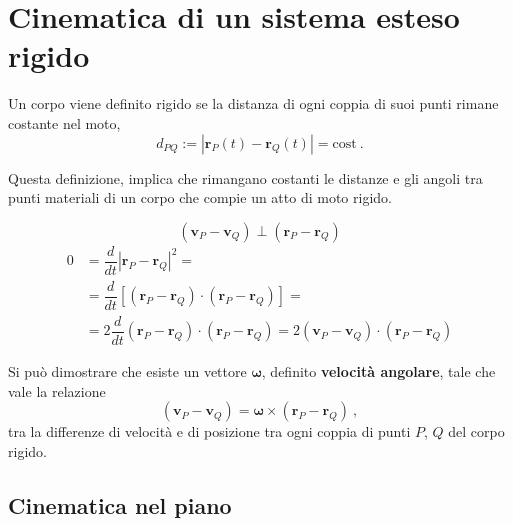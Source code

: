 \section{Cinematica di un sistema esteso rigido}
\begin{definition} Un corpo viene definito rigido se la distanza di ogni coppia di suoi punti rimane costante nel moto,
    \begin{equation}
        d_{PQ} := | \mathbf{r}_P(t) - \mathbf{r}_Q(t) | = \text{cost} \ .
    \end{equation}
\end{definition}
Questa definizione, implica che rimangano costanti le distanze e gli angoli tra punti materiali di un corpo che compie un atto di moto rigido.

\begin{equation}
    \left( \mathbf{v}_P - \mathbf{v}_Q \right) \perp \left( \mathbf{r}_P - \mathbf{r}_Q \right)
\end{equation}
\begin{equation}
\begin{aligned}
    0 & = \dfrac{d}{dt} | \mathbf{r}_P - \mathbf{r}_Q |^2 = \\
    & = \dfrac{d}{dt} \left[ \left( \mathbf{r}_P - \mathbf{r}_Q \right) \cdot \left( \mathbf{r}_P - \mathbf{r}_Q \right) \right] = \\
    & = 2 \dfrac{d}{dt} \left( \mathbf{r}_P - \mathbf{r}_Q \right) \cdot \left( \mathbf{r}_P - \mathbf{r}_Q \right) = 2 \left( \mathbf{v}_P - \mathbf{v}_Q \right) \cdot \left( \mathbf{r}_P - \mathbf{r}_Q \right)
\end{aligned}
\end{equation}

\begin{definition} Si può dimostrare che esiste un vettore $\mathbf{\omega}$, definito \textbf{velocità angolare}, tale che vale la relazione 
\begin{equation}
    \left( \mathbf{v}_P - \mathbf{v}_Q \right) = \boldsymbol{\omega} \times \left( \mathbf{r}_P - \mathbf{r}_Q \right) \ ,
\end{equation}
tra la differenze di velocità e di posizione tra ogni coppia di punti $P$, $Q$ del corpo rigido.
\end{definition}

\subsection{Cinematica nel piano}
